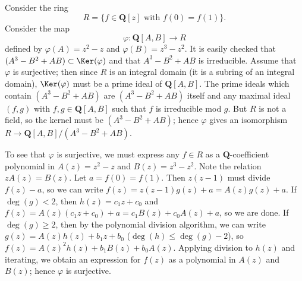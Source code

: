 \begin{example}
\label{example-affine-open-not-standard}
Consider the ring
$$
R = \{ f \in \mathbf{Q}[z]\text{ with }f(0) = f(1) \}.
$$
Consider the map
$$
\varphi : \mathbf{Q}[A, B] \to R
$$
defined by $\varphi(A) = z^2-z$ and $\varphi(B) = z^3-z^2$.  It is
easily checked that $(A^3 - B^2 + AB) \subset \Ker(\varphi)$ and that
$A^3 - B^2 + AB$ is irreducible. Assume that $\varphi$ is surjective;
then since $R$ is an integral domain (it is a subring of an integral
domain), $\Ker(\varphi)$ must be a prime ideal of $\mathbf{Q}[A, B]$.
The prime ideals which contain $(A^3-B^2 + AB)$ are $(A^3-B^2 + AB)$
itself and any maximal ideal $(f, g)$ with $f, g\in\mathbf{Q}[A, B]$
such that $f$ is irreducible mod $g$. But $R$ is not a field, so the
kernel must be $(A^3-B^2 + AB)$; hence $\varphi$ gives an isomorphism
$R \to \mathbf{Q}[A, B]/(A^3-B^2 + AB)$.

\medskip\noindent
To see that $\varphi$ is surjective, we must express any
$f\in R$ as a $\mathbf{Q}$-coefficient polynomial in $A(z) = z^2-z$
and $B(z) = z^3-z^2$. Note the relation $zA(z) = B(z)$. Let
$a = f(0) = f(1)$. Then $z(z-1)$ must divide $f(z)-a$, so we can write
$f(z) = z(z-1)g(z)+a = A(z)g(z)+a$.  If $\deg(g) < 2$, then
$h(z) = c_1z + c_0$ and $f(z) = A(z)(c_1z + c_0)+a = c_1B(z)+c_0A(z)+a$, so we
are done.  If $\deg(g)\geq 2$, then by the polynomial division
algorithm, we can write $g(z) = A(z)h(z)+b_1z + b_0$
($\deg(h)\leq\deg(g)-2$), so $f(z) = A(z)^2h(z)+b_1B(z)+b_0A(z)$.
Applying division to $h(z)$ and iterating, we obtain an expression
for $f(z)$ as a polynomial in $A(z)$ and $B(z)$; hence $\varphi$ is
surjective.


\end{example}
